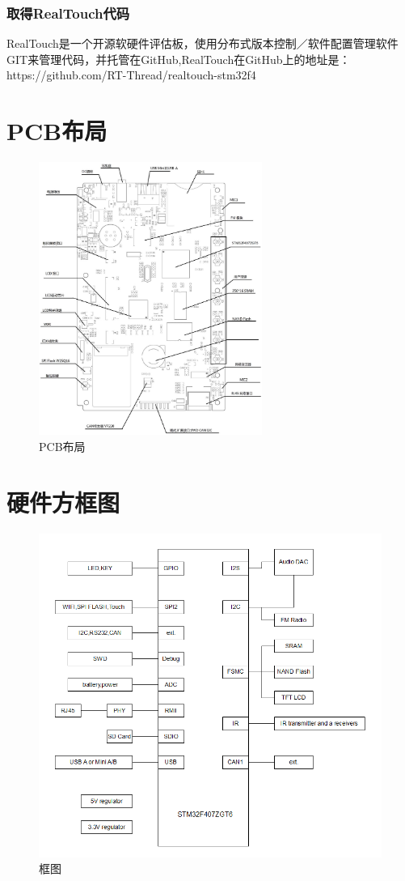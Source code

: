 \documentclass[titlepage]{article}
\begin{document}
 \subsubsection{取得RealTouch代码}
 RealTouch是一个开源软硬件评估板，使用分布式版本控制／软件配置管理软件GIT来管理代码，并托管在GitHub,RealTouch在GitHub上的地址是：https://github.com/RT-Thread/realtouch-stm32f4
\newpage
\section{PCB布局}

 \begin{figure}[h]
 \centering
 \includegraphics[width=0.65\textwidth]{board_info.eps}
 \caption{PCB布局}
 \end{figure}
\newpage
\section{硬件方框图}

 \begin{figure}[h]
 \centering
 \includegraphics[width=16cm]{bus.png}
 \caption{框图}
 \end{figure}
 \newpage
\end{document}
